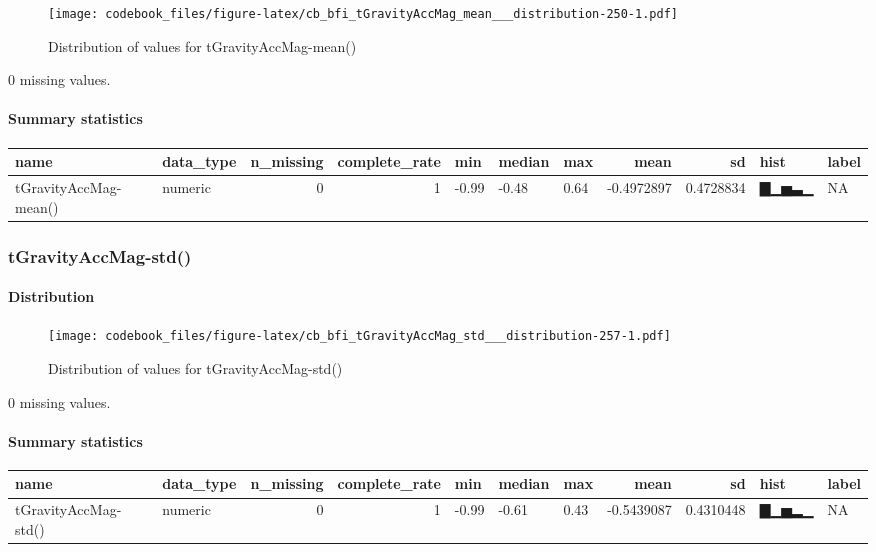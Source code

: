 \documentclass[
]{article}
\begin{document}
\begin{figure}
\centering
\texttt{[image: codebook\_files/figure-latex/cb\_bfi\_tGravityAccMag\_mean\_\_\_distribution-250-1.pdf]}
\caption{Distribution of values for tGravityAccMag-mean()}
\end{figure}

0 missing values.

\hypertarget{tGravityAccMag_mean___summary}{%
\paragraph{Summary statistics}\label{tGravityAccMag_mean___summary}}

\begin{longtable}[]{@{}llrrlllrrll@{}}
\toprule
name & data\_type & n\_missing & complete\_rate & min & median & max &
mean & sd & hist & label \\
\midrule
\endhead
tGravityAccMag-mean() & numeric & 0 & 1 & -0.99 & -0.48 & 0.64 &
-0.4972897 & 0.4728834 & ▇▁▅▃▁ & NA \\
\bottomrule
\end{longtable}

\hypertarget{tGravityAccMag_std__}{%
\subsubsection{tGravityAccMag-std()}\label{tGravityAccMag_std__}}

\hypertarget{tGravityAccMag_std___distribution}{%
\paragraph{Distribution}\label{tGravityAccMag_std___distribution}}

\begin{figure}
\centering
\texttt{[image: codebook\_files/figure-latex/cb\_bfi\_tGravityAccMag\_std\_\_\_distribution-257-1.pdf]}
\caption{Distribution of values for tGravityAccMag-std()}
\end{figure}

0 missing values.

\hypertarget{tGravityAccMag_std___summary}{%
\paragraph{Summary statistics}\label{tGravityAccMag_std___summary}}

\begin{longtable}[]{@{}llrrlllrrll@{}}
\toprule
name & data\_type & n\_missing & complete\_rate & min & median & max &
mean & sd & hist & label \\
\midrule
\endhead
tGravityAccMag-std() & numeric & 0 & 1 & -0.99 & -0.61 & 0.43 &
-0.5439087 & 0.4310448 & ▇▁▅▂▁ & NA \\
\bottomrule
\end{longtable}
\end{document}

